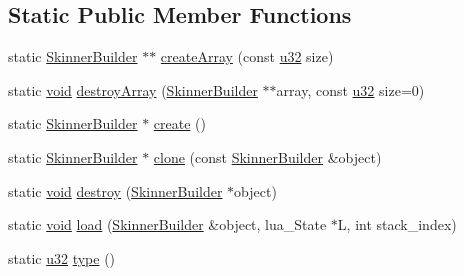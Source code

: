 \subsection*{Static Public Member Functions}
\begin{DoxyCompactItemize}
\item 
static \mbox{\hyperlink{classnjli_1_1_skinner_builder}{Skinner\+Builder}} $\ast$$\ast$ \mbox{\hyperlink{classnjli_1_1_skinner_builder_a8344d2b1a58676136d3fa122d4d38529}{create\+Array}} (const \mbox{\hyperlink{_util_8h_a10e94b422ef0c20dcdec20d31a1f5049}{u32}} size)
\item 
static \mbox{\hyperlink{_thread_8h_af1e856da2e658414cb2456cb6f7ebc66}{void}} \mbox{\hyperlink{classnjli_1_1_skinner_builder_ad3dff1600ab1e01de4e4932fde4d58e2}{destroy\+Array}} (\mbox{\hyperlink{classnjli_1_1_skinner_builder}{Skinner\+Builder}} $\ast$$\ast$array, const \mbox{\hyperlink{_util_8h_a10e94b422ef0c20dcdec20d31a1f5049}{u32}} size=0)
\item 
static \mbox{\hyperlink{classnjli_1_1_skinner_builder}{Skinner\+Builder}} $\ast$ \mbox{\hyperlink{classnjli_1_1_skinner_builder_a23dec85823c098ba80e17b6e3a7f86b0}{create}} ()
\item 
static \mbox{\hyperlink{classnjli_1_1_skinner_builder}{Skinner\+Builder}} $\ast$ \mbox{\hyperlink{classnjli_1_1_skinner_builder_ac90e72b4b4b29cf200e714b6639807eb}{clone}} (const \mbox{\hyperlink{classnjli_1_1_skinner_builder}{Skinner\+Builder}} \&object)
\item 
static \mbox{\hyperlink{_thread_8h_af1e856da2e658414cb2456cb6f7ebc66}{void}} \mbox{\hyperlink{classnjli_1_1_skinner_builder_ab2433bcdd5d80f4e829a0636e3e3f3d3}{destroy}} (\mbox{\hyperlink{classnjli_1_1_skinner_builder}{Skinner\+Builder}} $\ast$object)
\item 
static \mbox{\hyperlink{_thread_8h_af1e856da2e658414cb2456cb6f7ebc66}{void}} \mbox{\hyperlink{classnjli_1_1_skinner_builder_aa8bb5bc2ecc561f3815c114341824d01}{load}} (\mbox{\hyperlink{classnjli_1_1_skinner_builder}{Skinner\+Builder}} \&object, lua\+\_\+\+State $\ast$L, int stack\+\_\+index)
\item 
static \mbox{\hyperlink{_util_8h_a10e94b422ef0c20dcdec20d31a1f5049}{u32}} \mbox{\hyperlink{classnjli_1_1_skinner_builder_ab9ce72b50595aff70d438828f3125fd9}{type}} ()
\end{DoxyCompactItemize}
